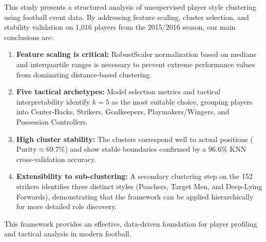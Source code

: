 \documentclass[12pt]{ai_conquer2026}
\begin{document}
This study presents a structured analysis of unsupervised player style clustering using football event data. By addressing feature scaling, cluster selection, and stability validation on 1,016 players from the 2015/2016 season, our main conclusions are:
\begin{enumerate}
  \item \textbf{Feature scaling is critical:} RobustScaler normalization based on medians and interquartile ranges is necessary to prevent extreme performance values from dominating distance-based clustering.
  \item \textbf{Five tactical archetypes:} Model selection metrics and tactical interpretability identify $k=5$ as the most suitable choice, grouping players into Center-Backs, Strikers, Goalkeepers, Playmakers/Wingers, and Possession Controllers.
  \item \textbf{High cluster stability:} The clusters correspond well to actual positions ($\text{Purity} \approx 69.7\%$) and show stable boundaries confirmed by a $96.6\%$ KNN cross-validation accuracy.
  \item \textbf{Extensibility to sub-clustering:} A secondary clustering step on the 152 strikers identifies three distinct styles (Poachers, Target Men, and Deep-Lying Forwards), demonstrating that the framework can be applied hierarchically for more detailed role discovery.
\end{enumerate}

This framework provides an effective, data-driven foundation for player profiling and tactical analysis in modern football.

\newpage
\printbibliography
\end{document}
